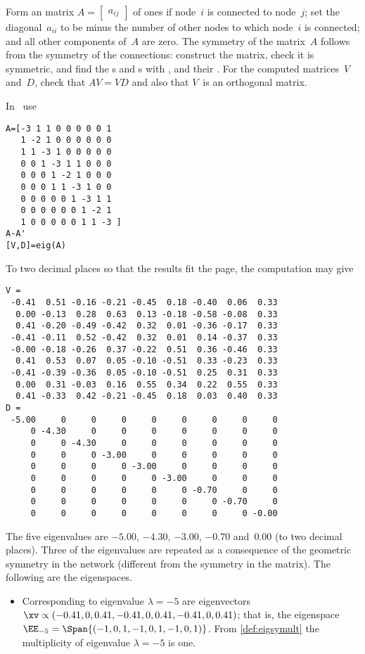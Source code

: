 \begin{example}
Form an matrix \(A=\begin{bmatrix} a_{ij} \end{bmatrix}\) of ones if node~\(i\) is connected to node~\(j\);  set the diagonal~\(a_{ii}\) to be minus the number of other nodes to which node~\(i\) is connected; and all other components of~\(A\) are zero.
The symmetry of the matrix~\(A\) follows from the symmetry of the connections: construct the matrix, check it is symmetric, and find the s and s with \script, and their .
For the computed matrices~\(V\) and~\(D\), check that \(AV=VD\) and also that \(V\)~is an orthogonal matrix.
\begin{solution} In \script\ use
\setbox\ajrqrbox\hbox{}%
\marginajrbox%
\begin{verbatim}
A=[-3 1 1 0 0 0 0 0 1
   1 -2 1 0 0 0 0 0 0
   1 1 -3 1 0 0 0 0 0
   0 0 1 -3 1 1 0 0 0
   0 0 0 1 -2 1 0 0 0
   0 0 0 1 1 -3 1 0 0
   0 0 0 0 0 1 -3 1 1
   0 0 0 0 0 0 1 -2 1
   1 0 0 0 0 0 1 1 -3 ]
A-A'
[V,D]=eig(A)
\end{verbatim}
To two decimal places so that the results fit the page, the computation may give
{\small%
\begin{verbatim}
V =
 -0.41  0.51 -0.16 -0.21 -0.45  0.18 -0.40  0.06  0.33
  0.00 -0.13  0.28  0.63  0.13 -0.18 -0.58 -0.08  0.33
  0.41 -0.20 -0.49 -0.42  0.32  0.01 -0.36 -0.17  0.33
 -0.41 -0.11  0.52 -0.42  0.32  0.01  0.14 -0.37  0.33
 -0.00 -0.18 -0.26  0.37 -0.22  0.51  0.36 -0.46  0.33
  0.41  0.53  0.07  0.05 -0.10 -0.51  0.33 -0.23  0.33
 -0.41 -0.39 -0.36  0.05 -0.10 -0.51  0.25  0.31  0.33
  0.00  0.31 -0.03  0.16  0.55  0.34  0.22  0.55  0.33
  0.41 -0.33  0.42 -0.21 -0.45  0.18  0.03  0.40  0.33
D =
 -5.00     0     0     0     0     0     0     0     0
     0 -4.30     0     0     0     0     0     0     0
     0     0 -4.30     0     0     0     0     0     0
     0     0     0 -3.00     0     0     0     0     0
     0     0     0     0 -3.00     0     0     0     0
     0     0     0     0     0 -3.00     0     0     0
     0     0     0     0     0     0 -0.70     0     0
     0     0     0     0     0     0     0 -0.70     0
     0     0     0     0     0     0     0     0 -0.00
\end{verbatim}
}%
The five eigenvalues are \(-5.00\), \(-4.30\), \(-3.00\), \(-0.70\) and~\(0.00\) (to two decimal places).
Three of the eigenvalues are repeated as a consequence of the geometric symmetry in the network (different from the symmetry in the matrix).
The following are the eigenspaces.
\begin{itemize}
\item Corresponding to eigenvalue \(\lambda=-5\) are eigenvectors \(\xv\propto(-0.41,0,0.41,-0.41,0,0.41,-0.41,0,0.41)\); that is, the eigenspace \(\EE_{-5}=\Span\{(-1,0,1,-1,0,1,-1,0,1)\}\).
From \cref{def:eigsymult} the multiplicity of eigenvalue \(\lambda=-5\) is one.


\end{itemize}
\end{solution}
\end{example}
